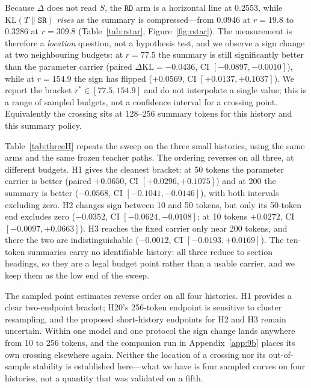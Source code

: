 \documentclass[sigconf,nonacm]{acmart}
\newcommand{\KL}{\mathrm{KL}}
\newcommand{\St}{\texttt{SR}}
\newcommand{\armRD}{\texttt{RD}}
\begin{document}
Because $\Delta$ does not read $S$, the $\armRD{}$ arm is a horizontal line at 0.2553, while $\KL(T\|\St)$
\emph{rises} as the summary is compressed---from 0.0946 at $r=19.8$ to 0.3286 at $r=309.8$
(Table~\ref{tab:rstar}, Figure~\ref{fig:rstar}). The measurement is therefore a \emph{location} question, not
a hypothesis test, and we observe a sign change at two neighbouring budgets: at $r=77.5$ the summary is still
significantly better than the parameter carrier (paired $\Delta\mathrm{KL}=-0.0436$, CI
$[-0.0897,-0.0010]$), while at $r=154.9$ the sign has flipped ($+0.0569$, CI $[+0.0137,+0.1037]$). We report
the bracket $r^\ast\in[77.5,154.9]$ and do not interpolate a single value; this is a range of sampled budgets,
not a confidence interval for a crossing point. Equivalently the crossing sits at 128--256 summary tokens for this
history and this summary policy.

Table~\ref{tab:threeH} repeats the sweep on the three small histories, using the same arms and the same frozen
teacher paths. The ordering reverses on all three, at different budgets. H1 gives the cleanest bracket: at 50
tokens the parameter carrier is better (paired $+0.0650$, CI $[+0.0296,+0.1075]$) and at 200 the summary is
better ($-0.0568$, CI $[-0.1041,-0.0146]$), with both intervals excluding zero. H2 changes sign between 10 and
50 tokens, but only its 50-token end excludes zero ($-0.0352$, CI $[-0.0624,-0.0108]$; at 10 tokens $+0.0272$,
CI $[-0.0097,+0.0663]$). H3 reaches the fixed carrier only near 200 tokens, and there the two are
indistinguishable ($-0.0012$, CI $[-0.0193,+0.0169]$). The ten-token summaries carry no identifiable history:
all three reduce to section headings, so they are a legal budget point rather than a usable carrier, and we keep
them as the low end of the sweep.

The sampled point estimates reverse order on all four histories. H1 provides a clear two-endpoint bracket;
H20's 256-token endpoint is sensitive to cluster resampling, and the proposed short-history endpoints for H2 and
H3 remain uncertain. Within one model and one protocol the sign change lands anywhere from 10 to 256 tokens, and
the companion run in Appendix~\ref{app:9b} places its own crossing elsewhere again. Neither the location of a
crossing nor its out-of-sample stability is established here---what we have is four sampled curves on four
histories, not a quantity that was validated on a fifth.
\end{document}
